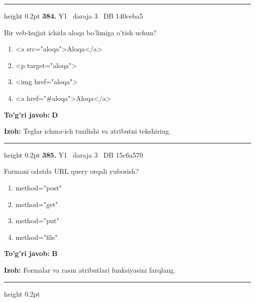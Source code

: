\documentclass[10pt,a4paper,oneside]{article}
\begin{document}
\vspace{2mm}\hrule height 0.2pt \vspace{4mm}
\hypertarget{q384}{\textbf{\color{ink}384.}}  {\color{muted}\scriptsize Y1 \textbullet\ daraja 3 \textbullet\ DB 140ceba5}
\par
Bir veb-hujjat ichida aloqa bo'limiga o'tish uchun?
\begin{enumerate}[label=\Alph*),leftmargin=9mm]
\item \textless{}a src="aloqa"\textgreater{}Aloqa\textless{}/a\textgreater{}
\item \textless{}p target="aloqa"\textgreater{}
\item \textless{}img href="aloqa"\textgreater{}
\item \textless{}a href="\#aloqa"\textgreater{}Aloqa\textless{}/a\textgreater{}
\end{enumerate}
\begin{tcolorbox}[enhanced,breakable,colback=teal!4,colframe=teal!45!black,boxrule=0.45pt,arc=1.2mm,left=2.8mm,right=2.8mm,top=2mm,bottom=2mm,before skip=2mm,after skip=2mm]
\textbf{\color{teal}To'g'ri javob:} \textbf{D}
\par\smallskip
\textbf{Izoh:} Teglar ichma-ich tuzilishi va atributni tekshiring.
\end{tcolorbox}
\vspace{2mm}\hrule height 0.2pt \vspace{4mm}
\hypertarget{q385}{\textbf{\color{ink}385.}}  {\color{muted}\scriptsize Y1 \textbullet\ daraja 3 \textbullet\ DB 15c6a570}
\par
Formani odatda URL query orqali yuborish?
\begin{enumerate}[label=\Alph*),leftmargin=9mm]
\item method="post"
\item method="get"
\item method="put"
\item method="file"
\end{enumerate}
\begin{tcolorbox}[enhanced,breakable,colback=teal!4,colframe=teal!45!black,boxrule=0.45pt,arc=1.2mm,left=2.8mm,right=2.8mm,top=2mm,bottom=2mm,before skip=2mm,after skip=2mm]
\textbf{\color{teal}To'g'ri javob:} \textbf{B}
\par\smallskip
\textbf{Izoh:} Formalar va rasm atributlari funksiyasini farqlang.
\end{tcolorbox}
\vspace{2mm}\hrule height 0.2pt \vspace{4mm}
\end{document}
